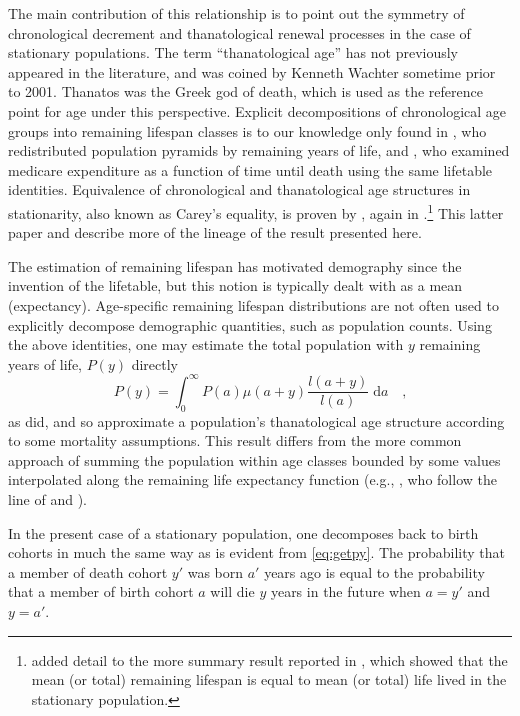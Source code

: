 \documentclass[leqno]{article}
\newcommand{\dd}{\; \mathrm{d}}
\begin{document}
The main contribution of this relationship is to point out
the symmetry of chronological decrement and thanatological renewal processes in
the case of stationary populations. The term ``thanatological age'' has not
previously appeared in the literature, and was coined by Kenneth Wachter
sometime prior to 2001. Thanatos was the Greek god of death, which is used as the reference point for age under this
perspective. Explicit decompositions of chronological
age groups into remaining lifespan classes is to our knowledge only found in
\citet{brouard1986structure}, who redistributed
population pyramids by remaining years of life, and
\citet{miller2001increasing}, who examined medicare expenditure as a function of time until death using the
same lifetable identities. Equivalence of chronological and
thanatological age structures in stationarity, also known as Carey's equality,
is proven by \citet{brouard1989mouvements}, again in
 \citet{vaupel2009life}.\footnote{\citet{vaupel2009life} added detail to the
 more summary result reported in \citet{goldstein2009life}, which showed that
 the mean (or total) remaining lifespan is equal to mean (or total) life lived in the stationary population.} 
This latter paper and \citet{goldstein2012historical} describe more of the
lineage of the result presented here. 

The estimation of remaining lifespan has motivated demography since
the invention of the lifetable, but this notion is typically dealt with as a
mean (expectancy). Age-specific remaining lifespan distributions are not often
used to explicitly decompose demographic quantities, such as population counts. Using
the above identities, one may estimate the total population with $y$
remaining years of life, $P(y)$ directly
\begin{equation}
\label{eq:getpy}
P(y) = \int _0 ^\infty P(a)\mu(a+y)\frac{l(a+y)}{l(a)} \dd a \quad \text{,}
\end{equation}
\noindent as \citet{brouard1986structure} did, and so approximate a population's
thanatological age structure according to some mortality assumptions. This result differs from the more common approach
of summing the population within age classes bounded by some values interpolated
along the remaining life expectancy function (e.g.,
\citet{sanderson2005average,sanderson2007new,sanderson2010remeasuring}, who
follow the line of \citet{hersch1944demographie} and \citet{ryder1975notes}).

In the present case of a stationary population, one decomposes back to birth
cohorts in much the same way as is evident from \eqref{eq:getpy}. The
probability that a member of death cohort $y'$ was born $a'$ years ago is equal to the probability that a member of birth cohort $a$ will die $y$ years in the future when $a = y'$ and $y = a'$.
\end{document}
